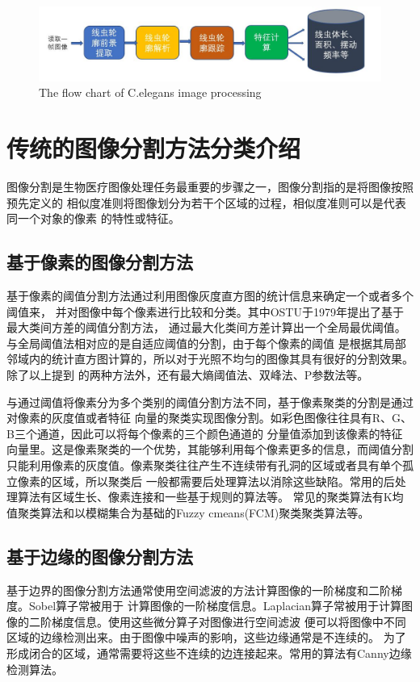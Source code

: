 	\begin{figure}[h]
	  \centering
	  \includegraphics[width=14cm]{figure/chap3/flow.jpg}
		{The flow chart of C.elegans image processing}
	  \label{fig:flow}
	\end{figure}
\section{传统的图像分割方法分类介绍}
	图像分割是生物医疗图像处理任务最重要的步骤之一，图像分割指的是将图像按照预先定义的
	相似度准则将图像划分为若干个区域的过程，相似度准则可以是代表同一个对象的像素
	的特性或特征。
\subsection{基于像素的图像分割方法}
	基于像素的阈值分割方法通过利用图像灰度直方图的统计信息来确定一个或者多个阈值来，
	并对图像中每个像素进行比较和分类。其中OSTU于1979年提出了基于最大类间方差的阈值分割方法，
	通过最大化类间方差计算出一个全局最优阈值。与全局阈值法相对应的是自适应阈值的分割，由于每个像素的阈值
	是根据其局部邻域内的统计直方图计算的，所以对于光照不均匀的图像其具有很好的分割效果。除了以上提到
	的两种方法外，还有最大熵阈值法、双峰法、P参数法等。
	
	与通过阈值将像素分为多个类别的阈值分割方法不同，基于像素聚类的分割是通过对像素的灰度值或者特征
	向量的聚类实现图像分割。如彩色图像往往具有R、G、B三个通道，因此可以将每个像素的三个颜色通道的
	分量值添加到该像素的特征向量里。这是像素聚类的一个优势，其能够利用每个像素更多的信息，而阈值分割
	只能利用像素的灰度值。像素聚类往往产生不连续带有孔洞的区域或者具有单个孤立像素的区域，所以聚类后
	一般都需要后处理算法以消除这些缺陷。常用的后处理算法有区域生长、像素连接和一些基于规则的算法等。
	常见的聚类算法有K均值聚类算法和以模糊集合为基础的Fuzzy cmeans(FCM)聚类聚类算法等。
\subsection{基于边缘的图像分割方法}
	基于边界的图像分割方法通常使用空间滤波的方法计算图像的一阶梯度和二阶梯度。Sobel算子常被用于
	计算图像的一阶梯度信息。Laplacian算子常被用于计算图像的二阶梯度信息。使用这些微分算子对图像进行空间滤波
	便可以将图像中不同区域的边缘检测出来。由于图像中噪声的影响，这些边缘通常是不连续的。
	为了形成闭合的区域，通常需要将这些不连续的边连接起来。常用的算法有Canny边缘检测算法。
